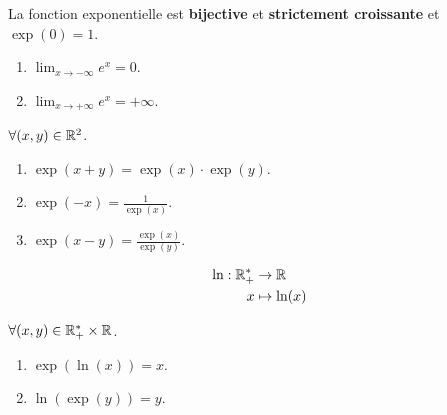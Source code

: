 \begin{proposition}
	La fonction exponentielle est \textbf{bijective} et \textbf{strictement croissante} et $\exp(0) = 1$.
    \begin{multicols}{2}
        \begin{enumerate}
            \item $\lim_{x \to -\infty} e^x = 0$.
            \item $\lim_{x \to +\infty} e^x = +\infty$.
        \end{enumerate}
    \end{multicols}
    \noindent $\forall (x, y) \in \mathbb{R}^2$.
    \begin{multicols}{2}
        \begin{enumerate}
            \item $\exp(x + y) = \exp(x) \cdot \exp(y)$.
            \item $\exp(-x) = \frac{1}{\exp(x)}$.
            \item $\exp(x - y) = \frac{\exp(x)}{\exp(y)}$.
        \end{enumerate}
    \end{multicols}
\end{proposition}

\begin{definition}
	\begin{align*}
		\ln : \mathbb{R}_+^* &\to \mathbb{R} \\
        x &\mapsto \ln(x)
	\end{align*}
\end{definition}

\begin{proposition}
	$\forall (x, y) \in \mathbb{R}_+^* \times \mathbb{R}$.
    \begin{multicols}{2}
        \begin{enumerate}
            \item $\exp(\ln(x)) = x$.
            \item $\ln(\exp(y)) = y$.
        \end{enumerate}
    \end{multicols}
\end{proposition}


